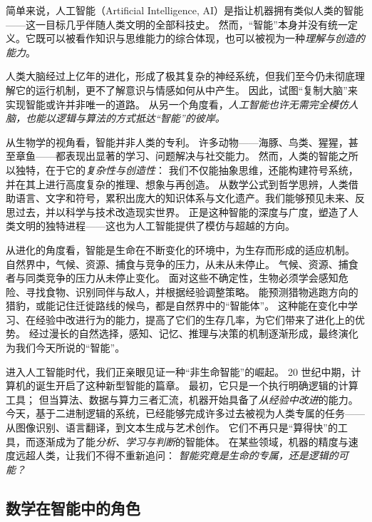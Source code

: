 简单来说，人工智能（Artificial Intelligence, AI）是指让机器拥有类似人类的智能——这一目标几乎伴随人类文明的全部科技史。  
然而，“智能”本身并没有统一定义。它既可以被看作知识与思维能力的综合体现，也可以被视为一种\emph{理解与创造的能力}。  

人类大脑经过上亿年的进化，形成了极其复杂的神经系统，但我们至今仍未彻底理解它的运行机制，更不了解意识与情感如何从中产生。  
因此，试图“复制大脑”来实现智能或许并非唯一的道路。  
从另一个角度看，\emph{人工智能也许无需完全模仿人脑，也能以逻辑与算法的方式抵达“智能”的彼岸。}  


从生物学的视角看，智能并非人类的专利。  
许多动物——海豚、鸟类、猩猩，甚至章鱼——都表现出显著的学习、问题解决与社交能力。
然而，人类的智能之所以独特，在于它的\emph{复杂性与创造性}：  
我们不仅能抽象思维，还能构建符号系统，并在其上进行高度复杂的推理、想象与再创造。  
从数学公式到哲学思辨，人类借助语言、文字和符号，累积出庞大的知识体系与文化遗产。我们能够预见未来、反思过去，并以科学与技术改造现实世界。
正是这种智能的深度与广度，塑造了人类文明的独特进程——这也为人工智能提供了模仿与超越的方向。

从进化的角度看，智能是生命在不断变化的环境中，为生存而形成的适应机制。  
自然界中，气候、资源、捕食与竞争的压力，从未从未停止。  
气候、资源、捕食者与同类竞争的压力从未停止变化。
面对这些不确定性，生物必须学会感知危险、寻找食物、识别同伴与敌人，并根据经验调整策略。
能预测猎物逃跑方向的猎豹，或能记住迁徙路线的候鸟，都是自然界中的“智能体”。  
这种能在变化中学习、在经验中改进行为的能力，提高了它们的生存几率，为它们带来了进化上的优势。
经过漫长的自然选择，感知、记忆、推理与决策的机制逐渐形成，最终演化为我们今天所说的“智能”。


进入人工智能时代，我们正亲眼见证一种“非生命智能”的崛起。  
20 世纪中期，计算机的诞生开启了这种新型智能的篇章。  
最初，它只是一个执行明确逻辑的计算工具；  
但当算法、数据与算力三者汇流，机器开始具备了\emph{从经验中改进}的能力。  
今天，基于二进制逻辑的系统，已经能够完成许多过去被视为人类专属的任务——从图像识别、语言翻译，到文本生成与艺术创作。
它们不再只是“算得快”的工具，而逐渐成为了能\emph{分析、学习与判断}的智能体。  
在某些领域，机器的精度与速度远超人类，让我们不得不重新追问：  
\emph{智能究竟是生命的专属，还是逻辑的可能？}  

\subsection{数学在智能中的角色}

